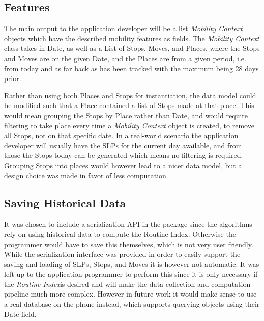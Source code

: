 \subsection{Features}
The main output to the application developer will be a list \textit{Mobility Context} objects which have the described mobility features as fields. The \textit{Mobility Context} class takes in Date, as well as a List of Stops, Moves, and Places, where the Stops and Moves are on the given Date, and the Places are from a given period, i.e. from today and as far back as has been tracked with the maximum being 28 days prior. 

Rather than using both Places and Stops for instantiation, the data model could be modified such that a Place contained a list of Stops made at that place. This would mean grouping the Stops by Place rather than Date, and would require filtering to take place every time a \textit{Mobility Context} object is created, to remove all Stops, not on that specific date. In a real-world scenario the application developer will usually have the SLPs for the current day available, and from those the Stops today can be generated which means no filtering is required. Grouping Stops into places would however lead to a nicer data model, but a design choice was made in favor of less computation. 

\subsection{Saving Historical Data}
It was chosen to include a serialization API in the package since the algorithms rely on using historical data to compute the Routine Index. Otherwise the programmer would have to save this themselves, which is not very user friendly. While the serialization interface was provided in order to easily support the saving and loading of SLPs, Stops, and Moves it is however not automatic. It was left up to the application programmer to perform this since it is only necessary if the \textit{Routine Index}is desired and will make the data collection and computation pipeline much more complex. However in future work it would make sense to use a real database on the phone instead, which supports querying objects using their Date field. 